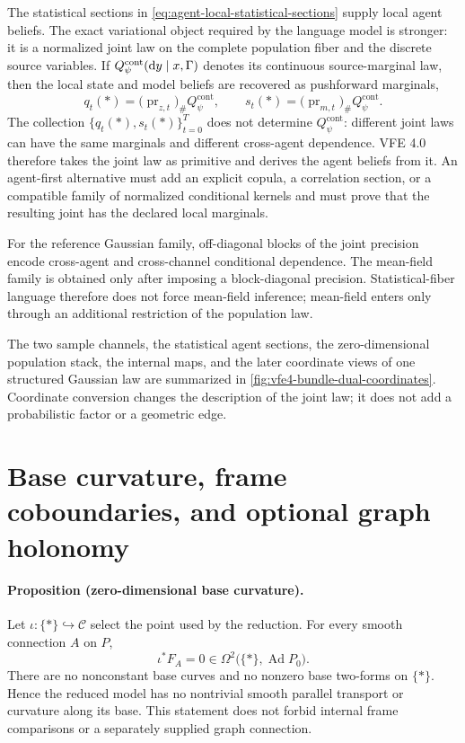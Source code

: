 The statistical sections in \cref{eq:agent-local-statistical-sections} supply local agent beliefs. The exact variational object required by the language model is stronger: it is a normalized joint law on the complete population fiber and the discrete source variables. If \(Q_\psi^{\mathrm{cont}}(\mathop{\mathrm dy}\mid x,\Gamma)\) denotes its continuous source-marginal law, then the local state and model beliefs are recovered as pushforward marginals,
\begin{equation}
q_t(\ast)
=\bigl(\operatorname{pr}_{z,t}\bigr)_\#Q_\psi^{\mathrm{cont}},
\qquad
s_t(\ast)
=\bigl(\operatorname{pr}_{m,t}\bigr)_\#Q_\psi^{\mathrm{cont}}.
\label{eq:agent-beliefs-as-population-marginals}
\end{equation}
The collection \(\{q_t(\ast),s_t(\ast)\}_{t=0}^{T}\) does not determine \(Q_\psi^{\mathrm{cont}}\): different joint laws can have the same marginals and different cross-agent dependence. VFE 4.0 therefore takes the joint law as primitive and derives the agent beliefs from it. An agent-first alternative must add an explicit copula, a correlation section, or a compatible family of normalized conditional kernels and must prove that the resulting joint has the declared local marginals.

For the reference Gaussian family, off-diagonal blocks of the joint precision encode cross-agent and cross-channel conditional dependence. The mean-field family is obtained only after imposing a block-diagonal precision. Statistical-fiber language therefore does not force mean-field inference; mean-field enters only through an additional restriction of the population law.

The two sample channels, the statistical agent sections, the zero-dimensional population stack, the internal maps, and the later coordinate views of one structured Gaussian law are summarized in \cref{fig:vfe4-bundle-dual-coordinates}. Coordinate conversion changes the description of the joint law; it does not add a probabilistic factor or a geometric edge.

\section{Base curvature, frame coboundaries, and optional graph holonomy}

\paragraph{Proposition (zero-dimensional base curvature).}
Let \(\iota:\{\ast\}\hookrightarrow\mathcal C\) select the point used by the reduction. For every smooth connection \(A\) on \(P\),
\begin{equation}
\iota^*F_A=0
\in\Omega^2\bigl(\{\ast\},\operatorname{Ad}P_0\bigr).
\label{eq:zero-dimensional-curvature-vanishes}
\end{equation}
There are no nonconstant base curves and no nonzero base two-forms on \(\{\ast\}\). Hence the reduced model has no nontrivial smooth parallel transport or curvature along its base. This statement does not forbid internal frame comparisons or a separately supplied graph connection.

